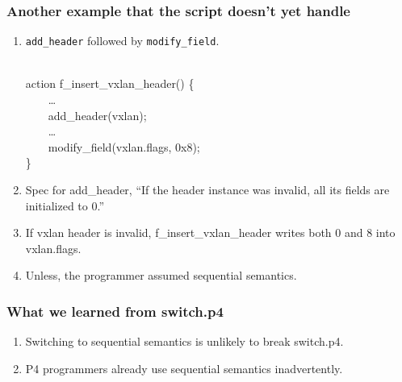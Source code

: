 \documentclass[aspectratio=169]{beamer}
\begin{document}
\begin{frame}[fragile]
  \frametitle{Another example that the script doesn't yet handle}
  \begin{enumerate}
    \item \texttt{add\_header} followed by \texttt{modify\_field}.
    \begin{texttt}\\
      action f\_insert\_vxlan\_header() \{ \\
      \ \ \ \  \dots \\
      \ \ \ \  add\_header(vxlan); \\
      \ \ \ \  \dots \\
      \ \ \ \  modify\_field(vxlan.flags, 0x8); \\
      \}
    \end{texttt}
    \item Spec for add\_header, ``If the header instance was invalid, all its fields are initialized to 0.''
    \item If vxlan header is invalid, f\_insert\_vxlan\_header writes both 0 and 8 into vxlan.flags.
    \item Unless, the programmer assumed sequential semantics.
  \end{enumerate}
\end{frame}

\begin{frame}[fragile]
  \frametitle{What we learned from switch.p4}
  \begin{enumerate}
    \item<1-> Switching to sequential semantics is unlikely to break switch.p4.
    \item<2-> P4 programmers already use sequential semantics inadvertently.
  \end{enumerate}
\end{frame}
\end{document}
